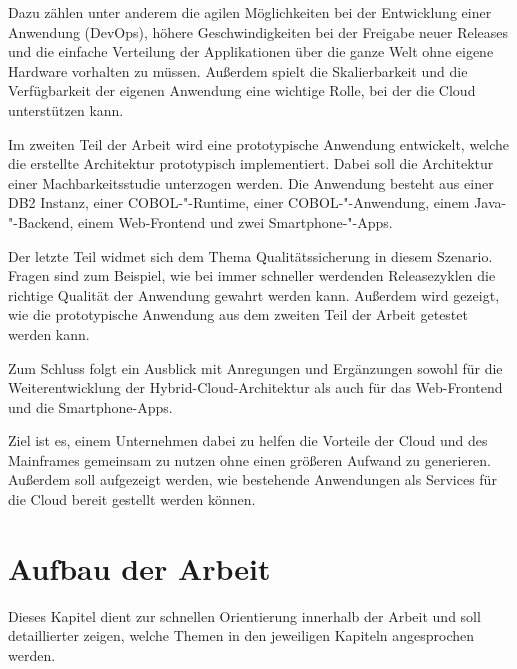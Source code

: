 Dazu zählen unter anderem die agilen Möglichkeiten bei der Entwicklung einer Anwendung (DevOps), höhere Geschwindigkeiten
bei der Freigabe neuer Releases und die einfache Verteilung der Applikationen über die ganze Welt ohne eigene Hardware
vorhalten zu müssen. Außerdem spielt die Skalierbarkeit und die Verfügbarkeit der eigenen Anwendung eine wichtige Rolle,
bei der die Cloud unterstützen kann.

Im zweiten Teil der Arbeit wird eine prototypische Anwendung entwickelt, welche die erstellte Architektur prototypisch
implementiert. Dabei soll die Architektur einer Machbarkeitsstudie unterzogen werden. Die Anwendung besteht aus einer
DB2 Instanz, einer COBOL-"-Runtime, einer COBOL-"-Anwendung, einem Java-"-Backend, einem Web-Frontend und zwei
Smartphone-"-Apps.

Der letzte Teil widmet sich dem Thema Qualitätssicherung in diesem Szenario. Fragen sind zum Beispiel, wie bei immer
schneller werdenden Releasezyklen die richtige Qualität der Anwendung gewahrt werden kann. Außerdem wird gezeigt, wie
die prototypische Anwendung aus dem zweiten Teil der Arbeit getestet werden kann.

Zum Schluss folgt ein Ausblick mit Anregungen und Ergänzungen sowohl für die Weiterentwicklung der Hybrid-Cloud-Architektur
als auch für das Web-Frontend und die Smartphone-Apps.

Ziel ist es, einem Unternehmen dabei zu helfen die Vorteile der Cloud und des Mainframes gemeinsam zu nutzen
ohne einen größeren Aufwand zu generieren. Außerdem soll aufgezeigt werden, wie bestehende Anwendungen als Services
für die Cloud bereit gestellt werden können.

\newpage

\section{Aufbau der Arbeit}
Dieses Kapitel dient zur schnellen Orientierung innerhalb der Arbeit und soll detaillierter zeigen, welche Themen in den
jeweiligen Kapiteln angesprochen werden.

